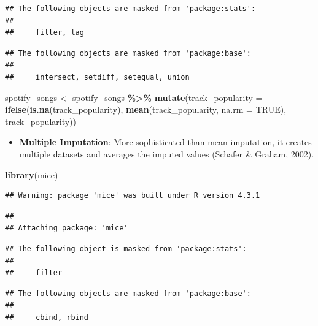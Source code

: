 \documentclass[
  b5paper]{book}
\newenvironment{Shaded}{\begin{snugshade}}{\end{snugshade}}
\newcommand{\AttributeTok}[1]{\textcolor[rgb]{0.13,0.29,0.53}{#1}}
\newcommand{\ConstantTok}[1]{\textcolor[rgb]{0.56,0.35,0.01}{#1}}
\newcommand{\FunctionTok}[1]{\textcolor[rgb]{0.13,0.29,0.53}{\textbf{#1}}}
\newcommand{\NormalTok}[1]{#1}
\newcommand{\OtherTok}[1]{\textcolor[rgb]{0.56,0.35,0.01}{#1}}
\newcommand{\SpecialCharTok}[1]{\textcolor[rgb]{0.81,0.36,0.00}{\textbf{#1}}}
\providecommand{\tightlist}{%
  \setlength{\itemsep}{0pt}\setlength{\parskip}{0pt}}
\begin{document}
\begin{verbatim}
## The following objects are masked from 'package:stats':
## 
##     filter, lag
\end{verbatim}

\begin{verbatim}
## The following objects are masked from 'package:base':
## 
##     intersect, setdiff, setequal, union
\end{verbatim}

\begin{Shaded}
\begin{Highlighting}[]
\NormalTok{spotify\_songs }\OtherTok{\textless{}{-}}\NormalTok{ spotify\_songs }\SpecialCharTok{\%\textgreater{}\%}
  \FunctionTok{mutate}\NormalTok{(}\AttributeTok{track\_popularity =} \FunctionTok{ifelse}\NormalTok{(}\FunctionTok{is.na}\NormalTok{(track\_popularity), }\FunctionTok{mean}\NormalTok{(track\_popularity, }\AttributeTok{na.rm =} \ConstantTok{TRUE}\NormalTok{), track\_popularity))}
\end{Highlighting}
\end{Shaded}

\begin{itemize}
\tightlist
\item
  \textbf{Multiple Imputation}: More sophisticated than mean imputation, it creates multiple datasets and averages the imputed values (Schafer \& Graham, 2002).
\end{itemize}

\begin{Shaded}
\begin{Highlighting}[]
\FunctionTok{library}\NormalTok{(mice)}
\end{Highlighting}
\end{Shaded}

\begin{verbatim}
## Warning: package 'mice' was built under R version 4.3.1
\end{verbatim}

\begin{verbatim}
## 
## Attaching package: 'mice'
\end{verbatim}

\begin{verbatim}
## The following object is masked from 'package:stats':
## 
##     filter
\end{verbatim}

\begin{verbatim}
## The following objects are masked from 'package:base':
## 
##     cbind, rbind
\end{verbatim}
\end{document}

